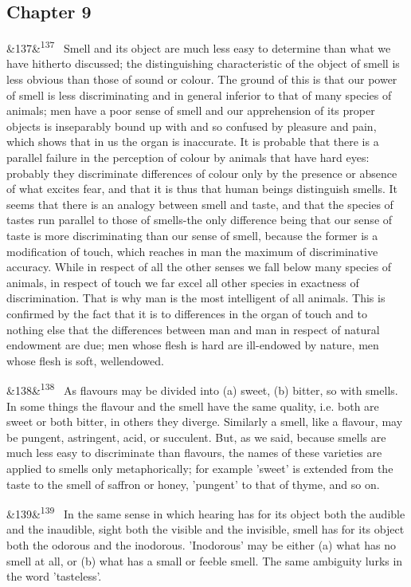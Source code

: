 \documentclass[12pt]{article}
\newcommand{\para}[1][]{\par\noindent\ifx&#1&\else\textsuperscript{\footnotesize #1}~\fi}
\begin{document}
\subsection*{Chapter 9}

\para[137] Smell and its object are much less easy to determine than what we have hitherto discussed; the distinguishing characteristic of the object of smell is less obvious than those of sound or colour. The ground of this is that our power of smell is less discriminating and in general inferior to that of many species of animals; men have a poor sense of smell and our apprehension of its proper objects is inseparably bound up with and so confused by pleasure and pain, which shows that in us the organ is inaccurate. It is probable that there is a parallel failure in the perception of colour by animals that have hard eyes: probably they discriminate differences of colour only by the presence or absence of what excites fear, and that it is thus that human beings distinguish smells. It seems that there is an analogy between smell and taste, and that the species of tastes run parallel to those of smells-the only difference being that our sense of taste is more discriminating than our sense of smell, because the former is a modification of touch, which reaches in man the maximum of discriminative accuracy. While in respect of all the other senses we fall below many species of animals, in respect of touch we far excel all other species in exactness of discrimination. That is why man is the most intelligent of all animals. This is confirmed by the fact that it is to differences in the organ of touch and to nothing else that the differences between man and man in respect of natural endowment are due; men whose flesh is hard are ill-endowed by nature, men whose flesh is soft, wellendowed.

\para[138] As flavours may be divided into (a) sweet, (b) bitter, so with smells. In some things the flavour and the smell have the same quality, i.e. both are sweet or both bitter, in others they diverge. Similarly a smell, like a flavour, may be pungent, astringent, acid, or succulent. But, as we said, because smells are much less easy to discriminate than flavours, the names of these varieties are applied to smells only metaphorically; for example 'sweet' is extended from the taste to the smell of saffron or honey, 'pungent' to that of thyme, and so on.

\para[139] In the same sense in which hearing has for its object both the audible and the inaudible, sight both the visible and the invisible, smell has for its object both the odorous and the inodorous. 'Inodorous' may be either (a) what has no smell at all, or (b) what has a small or feeble smell. The same ambiguity lurks in the word 'tasteless'.
\end{document}
